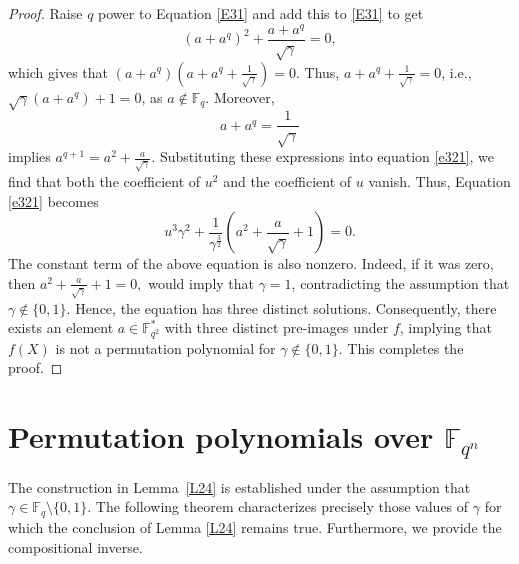 \documentclass[11pt]{amsart}
\theoremstyle{plain}
\numberwithin{equation}{section}
\theoremstyle{definition}
\newcommand{\F}{\mathbb F}
\begin{document}
\begin{proof}
Raise $q$ power to Equation \eqref{E31} and add this to  \eqref{E31} to get
\[
(a+a^q)^{2}+\frac{a+a^q}{\sqrt{\gamma}}=0, 
\]
which gives that $\left(a+a^q\right)\left(a+a^q+\frac{1}{\sqrt{\gamma}}\right)=0$. Thus, $a+a^q+\frac{1}{\sqrt{\gamma}}=0$, i.e., $\sqrt{\gamma}(a+a^q)+1=0$, as $a \not \in \F_q$.
Moreover, 
\[
a+a^{q}=\frac{1}{\sqrt{\gamma}}
\] 
implies $a^{q+1}=a^2+\frac{a}{\sqrt{\gamma}}$. Substituting these expressions into equation \eqref{e321}, we find that both the coefficient of \(u^2\) and the coefficient of \(u\) vanish. Thus, Equation \eqref{e321} becomes 
\[
u^3 \gamma^2+\frac{1}{\gamma^{\frac{3}{2}}}\left(a^2+\frac{a}{\sqrt{\gamma}}+1\right)=0.
\]
The constant term of the above equation is also nonzero. Indeed, if it was zero, then
\(
a^2+\frac{a}{\sqrt{\gamma}}+1=0,
\)
would imply that $\gamma=1$, contradicting the assumption that $\gamma\notin\{0,1\}$. Hence, the equation has three distinct solutions. Consequently, there exists an element $a\in\F_{q^2}^{*}$ with three distinct pre-images under $f$, implying that $f(X)$ is not a permutation polynomial for $\gamma\notin\{0,1\}$. This completes the proof.



\end{proof}
\section{Permutation polynomials over $\F_{q^n}$}\label{S4}

The construction in Lemma~\ref{L24} is established under the assumption that 
$\gamma \in \mathbb{F}_{q} \setminus \{0,1\}$. The following theorem characterizes precisely those values of $\gamma$ for which the conclusion of Lemma \ref{L24} remains true. Furthermore, we provide the compositional inverse.
\end{document}
